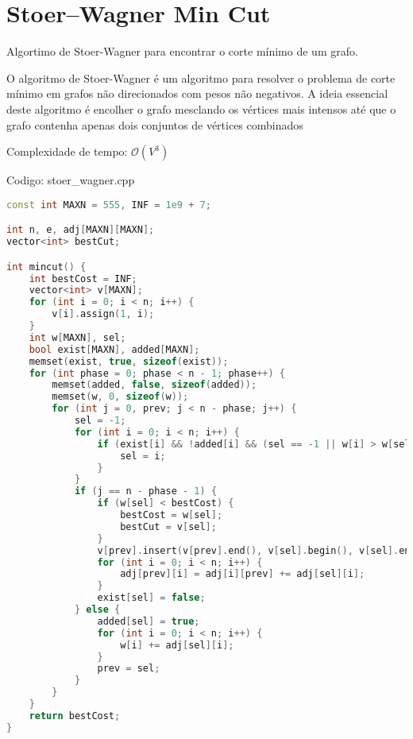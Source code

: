\documentclass[10pt, a4paper, oneside]{book}
\begin{document}
\section{Stoer–Wagner Min Cut}


Algortimo de Stoer-Wagner para encontrar o corte mínimo de um grafo.



O algoritmo de Stoer-Wagner é um algoritmo para resolver o problema de corte mínimo em grafos não direcionados com pesos não negativos. A ideia essencial deste algoritmo é encolher o grafo mesclando os vértices mais intensos até que o grafo contenha apenas dois conjuntos de vértices combinados



Complexidade de tempo: $\mathcal{O}(V^3)$

\hfill

Codigo: stoer\_wagner.cpp

\begin{lstlisting}[language=C++]
const int MAXN = 555, INF = 1e9 + 7;

int n, e, adj[MAXN][MAXN];
vector<int> bestCut;

int mincut() {
    int bestCost = INF;
    vector<int> v[MAXN];
    for (int i = 0; i < n; i++) {
        v[i].assign(1, i);
    }
    int w[MAXN], sel;
    bool exist[MAXN], added[MAXN];
    memset(exist, true, sizeof(exist));
    for (int phase = 0; phase < n - 1; phase++) {
        memset(added, false, sizeof(added));
        memset(w, 0, sizeof(w));
        for (int j = 0, prev; j < n - phase; j++) {
            sel = -1;
            for (int i = 0; i < n; i++) {
                if (exist[i] && !added[i] && (sel == -1 || w[i] > w[sel])) {
                    sel = i;
                }
            }
            if (j == n - phase - 1) {
                if (w[sel] < bestCost) {
                    bestCost = w[sel];
                    bestCut = v[sel];
                }
                v[prev].insert(v[prev].end(), v[sel].begin(), v[sel].end());
                for (int i = 0; i < n; i++) {
                    adj[prev][i] = adj[i][prev] += adj[sel][i];
                }
                exist[sel] = false;
            } else {
                added[sel] = true;
                for (int i = 0; i < n; i++) {
                    w[i] += adj[sel][i];
                }
                prev = sel;
            }
        }
    }
    return bestCost;
}\end{lstlisting}
\hfill

\newpage
\end{document}
